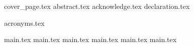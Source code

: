 \documentclass[oneside]{report}
\begin{document}
{cover_page.tex}
\setcounter{page}{2}
{abstract.tex}
{acknowledge.tex}
{declaration.tex}

\renewcommand{\contentsname}{Mục lục}
\tableofcontents

{acronyms.tex}

\listoffigures
\clearpage
\listoftables
\clearpage

\setcounter{page}{1}
{main.tex}
{main.tex}
{main.tex}
{main.tex}
{main.tex}
{main.tex}

\printbibliography[title={Tài liệu tham khảo}]
\end{document}
